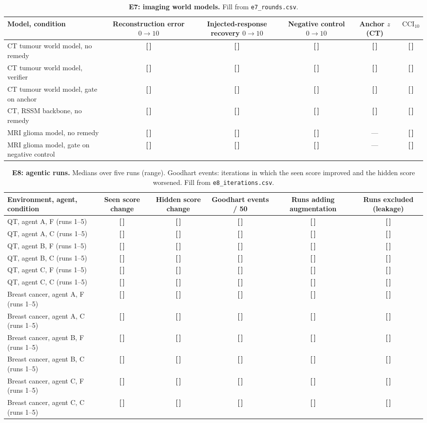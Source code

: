 \documentclass[11pt,a4paper]{article}
\newcommand{\T}{{\color{red}\textbf{[\,]}}}
\newcommand{\CCI}{\mathrm{CCI}}
\begin{document}
\FloatBarrier
\begin{table}[!htbp]\centering\footnotesize
\caption{\textbf{E7: imaging world models.} Fill from \texttt{e7\_rounds.csv}.}
\begin{tabularx}{\textwidth}{@{}p{3.9cm} C C C C C@{}}\toprule
Model, condition & Reconstruction error $0\to10$ & Injected-response recovery $0\to10$ & Negative control $0\to10$ & Anchor $z$ (CT) & $\CCI_{10}$\\\midrule
CT tumour world model, no remedy & \T & \T & \T & \T & \T\\
CT tumour world model, verifier & \T & \T & \T & \T & \T\\
CT tumour world model, gate on anchor & \T & \T & \T & \T & \T\\
CT, RSSM backbone, no remedy & \T & \T & \T & \T & \T\\
MRI glioma model, no remedy & \T & \T & \T & --- & \T\\
MRI glioma model, gate on negative control & \T & \T & \T & --- & \T\\
\bottomrule\end{tabularx}
\end{table}
\FloatBarrier
\begin{table}[!htbp]\centering\scriptsize
\caption{\textbf{E8: agentic runs.} Medians over five runs (range). Goodhart events: iterations in which the seen score improved and the hidden score worsened. Fill from \texttt{e8\_iterations.csv}.}
\begin{tabularx}{\textwidth}{@{}p{3.9cm} C C C C C@{}}\toprule
Environment, agent, condition & Seen score change & Hidden score change & Goodhart events / 50 & Runs adding augmentation & Runs excluded (leakage)\\\midrule
QT, agent A, F (runs 1--5) & \T & \T & \T & \T & \T\\
QT, agent A, C (runs 1--5) & \T & \T & \T & \T & \T\\
QT, agent B, F (runs 1--5) & \T & \T & \T & \T & \T\\
QT, agent B, C (runs 1--5) & \T & \T & \T & \T & \T\\
QT, agent C, F (runs 1--5) & \T & \T & \T & \T & \T\\
QT, agent C, C (runs 1--5) & \T & \T & \T & \T & \T\\
\midrule
Breast cancer, agent A, F (runs 1--5) & \T & \T & \T & \T & \T\\
Breast cancer, agent A, C (runs 1--5) & \T & \T & \T & \T & \T\\
Breast cancer, agent B, F (runs 1--5) & \T & \T & \T & \T & \T\\
Breast cancer, agent B, C (runs 1--5) & \T & \T & \T & \T & \T\\
Breast cancer, agent C, F (runs 1--5) & \T & \T & \T & \T & \T\\
Breast cancer, agent C, C (runs 1--5) & \T & \T & \T & \T & \T\\
\bottomrule\end{tabularx}
\end{table}
\end{document}
